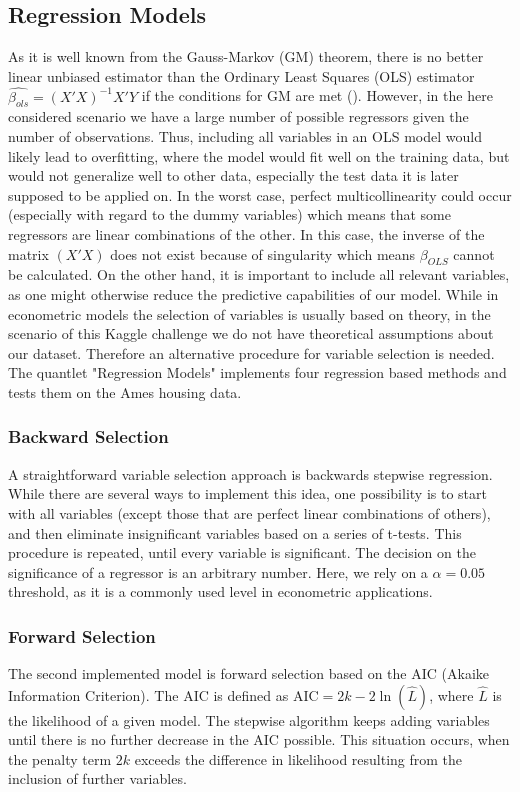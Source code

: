 \subsection{Regression Models} \label{sec:reg_theory}
As it is well known from the Gauss-Markov (GM) theorem, there is no better linear unbiased estimator than the Ordinary Least Squares (OLS) estimator $\hat{\beta_{ols}} = (X'X)^{-1}X'Y$  if the conditions for GM are met (\cite{wooldridge_introductory_2015}). However, in the here considered scenario we have a large number of possible regressors given the number of observations. Thus, including all variables in an OLS model would likely lead to overfitting, where the model would fit well on the training data, but would not generalize well to other data, especially the test data it is later supposed to be applied on. In the worst case, perfect multicollinearity could occur (especially with regard to the dummy variables)  which means that some regressors are linear combinations of the other. In this case, the inverse of the matrix $(X'X)$ does not exist  because of singularity which means $\beta_{OLS}$ cannot be calculated.  
On the other hand, it is important to include all relevant variables, as one  might otherwise reduce the predictive capabilities of our model. 
While in econometric models  the selection of variables is usually based on theory, in the scenario of this Kaggle challenge we do not have theoretical assumptions about our dataset. Therefore an alternative procedure for variable selection is needed. The quantlet "Regression Models"  implements four regression based methods and tests them on the Ames housing data. 

\subsubsection{Backward Selection}
A straightforward variable selection approach is backwards stepwise regression. While there are several ways to implement this idea, one possibility is to  start with all variables (except those that are perfect linear combinations of others), and then eliminate insignificant variables based on a series of  t-tests. This procedure is repeated, until every variable is significant. The decision on the significance of a regressor is an arbitrary number. Here, we rely on a $\alpha = 0.05$ threshold, as it is a commonly used level in econometric applications. 

\subsubsection{Forward Selection}
The second implemented model is forward selection based on the AIC (Akaike Information Criterion). The AIC is defined as 
${\displaystyle \mathrm{AIC}=2k-2\ln({\hat{L}})}$, where $\hat{L}$ is the likelihood of a given model. The stepwise algorithm keeps adding variables until there is no further decrease in the AIC possible. This situation occurs, when the penalty term $2k$ exceeds the difference in likelihood resulting from the inclusion of further variables. 

